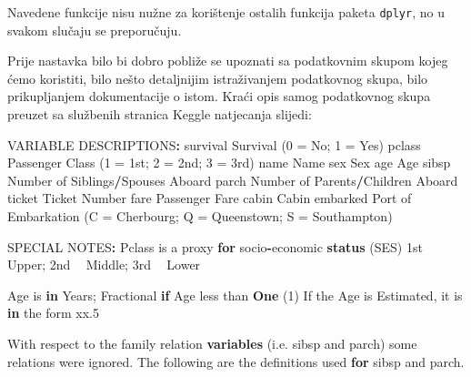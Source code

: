 \documentclass[]{book}
\newenvironment{Shaded}{\begin{snugshade}}{\end{snugshade}}
\newcommand{\KeywordTok}[1]{\textcolor[rgb]{0.13,0.29,0.53}{\textbf{#1}}}
\newcommand{\DataTypeTok}[1]{\textcolor[rgb]{0.13,0.29,0.53}{#1}}
\newcommand{\DecValTok}[1]{\textcolor[rgb]{0.00,0.00,0.81}{#1}}
\newcommand{\StringTok}[1]{\textcolor[rgb]{0.31,0.60,0.02}{#1}}
\newcommand{\ControlFlowTok}[1]{\textcolor[rgb]{0.13,0.29,0.53}{\textbf{#1}}}
\newcommand{\OperatorTok}[1]{\textcolor[rgb]{0.81,0.36,0.00}{\textbf{#1}}}
\newcommand{\NormalTok}[1]{#1}
\theoremstyle{definition}
\theoremstyle{definition}
\theoremstyle{definition}
\theoremstyle{remark}
\begin{document}
Navedene funkcije nisu nužne za korištenje ostalih funkcija paketa
\texttt{dplyr}, no u svakom slučaju se preporučuju.

Prije nastavka bilo bi dobro pobliže se upoznati sa podatkovnim skupom
kojeg ćemo koristiti, bilo nešto detaljnijim istraživanjem podatkovnog
skupa, bilo prikupljanjem dokumentacije o istom. Kraći opis samog
podatkovnog skupa preuzet sa službenih stranica Keggle natjecanja
slijedi:

\begin{Shaded}
\begin{Highlighting}[]
\NormalTok{VARIABLE DESCRIPTIONS}\OperatorTok{:}
\NormalTok{survival        Survival}
\NormalTok{                (}\DecValTok{0}\NormalTok{ =}\StringTok{ }\NormalTok{No; }\DecValTok{1}\NormalTok{ =}\StringTok{ }\NormalTok{Yes)}
\NormalTok{pclass          Passenger Class}
\NormalTok{                (}\DecValTok{1}\NormalTok{ =}\StringTok{ }\NormalTok{1st; }\DecValTok{2}\NormalTok{ =}\StringTok{ }\NormalTok{2nd; }\DecValTok{3}\NormalTok{ =}\StringTok{ }\NormalTok{3rd)}
\NormalTok{name            Name}
\NormalTok{sex             Sex}
\NormalTok{age             Age}
\NormalTok{sibsp           Number of Siblings}\OperatorTok{/}\NormalTok{Spouses Aboard}
\NormalTok{parch           Number of Parents}\OperatorTok{/}\NormalTok{Children Aboard}
\NormalTok{ticket          Ticket Number}
\NormalTok{fare            Passenger Fare}
\NormalTok{cabin           Cabin}
\NormalTok{embarked        Port of Embarkation}
\NormalTok{                (}\DataTypeTok{C =}\NormalTok{ Cherbourg; }\DataTypeTok{Q =}\NormalTok{ Queenstown; }\DataTypeTok{S =}\NormalTok{ Southampton)}

\NormalTok{SPECIAL NOTES}\OperatorTok{:}
\NormalTok{Pclass is a proxy }\ControlFlowTok{for}\NormalTok{ socio}\OperatorTok{-}\NormalTok{economic }\KeywordTok{status}\NormalTok{ (SES)}
\NormalTok{ 1st }\OperatorTok{~}\StringTok{ }\NormalTok{Upper; 2nd }\OperatorTok{~}\StringTok{ }\NormalTok{Middle; 3rd }\OperatorTok{~}\StringTok{ }\NormalTok{Lower}

\NormalTok{Age is }\ControlFlowTok{in}\NormalTok{ Years; Fractional }\ControlFlowTok{if}\NormalTok{ Age less than }\KeywordTok{One}\NormalTok{ (}\DecValTok{1}\NormalTok{)}
\NormalTok{ If the Age is Estimated, it is }\ControlFlowTok{in}\NormalTok{ the form xx.}\DecValTok{5}

\NormalTok{With respect to the family relation }\KeywordTok{variables}\NormalTok{ (i.e. sibsp and parch)}
\NormalTok{some relations were ignored.  The following are the definitions used}
\ControlFlowTok{for}\NormalTok{ sibsp and parch.}


\end{Highlighting}
\end{Shaded}
\end{document}
